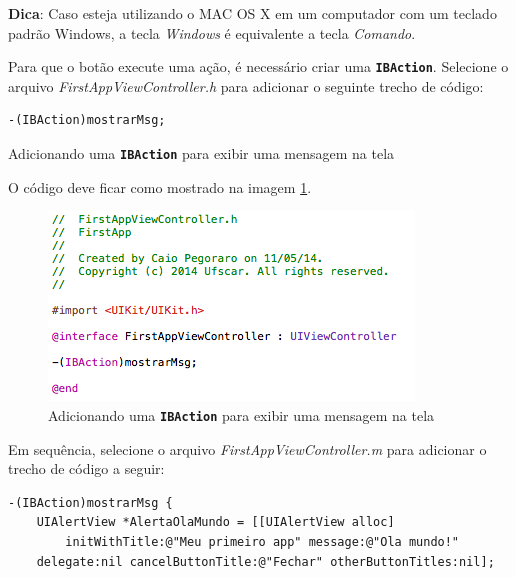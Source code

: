\documentclass[a4paper,12pt,brazil,doubleside]{book}
\begin{document}
\begin{singlespace}
\bigskip

\begin{framed}

\textbf{Dica}: Caso esteja utilizando o MAC OS X em um computador com um teclado padrão Windows, a tecla \textit{Windows }é equivalente a tecla \textit{Comando}.
\end{framed}



Para que o botão execute uma ação, é necessário criar uma \texttt{\textbf{IBAction}}. Selecione o arquivo \emph{FirstAppViewController.h} para adicionar o seguinte trecho de código:

\begin{listing}
\begin{verbatim}
-(IBAction)mostrarMsg;
\end{verbatim}
\caption{Adicionando uma \texttt{\textbf{IBAction}} para exibir uma mensagem na tela}
\end{listing}


O código deve ficar como mostrado na imagem \ref{fig:IBAction_msg}.

\begin{figure}[H]
  \centering
  \includegraphics[width=.75\textwidth]{figuras/3/tela_novo_projeto_21.png}
  \caption{Adicionando uma \texttt{\textbf{IBAction}} para exibir uma mensagem na tela}
  \label{fig:IBAction_msg}
\end{figure}


Em sequência, selecione o arquivo \emph{FirstAppViewController.m} para adicionar o  trecho de código a seguir:

\begin{listing}
\begin{verbatim}
-(IBAction)mostrarMsg {
    UIAlertView *AlertaOlaMundo = [[UIAlertView alloc] 
    	initWithTitle:@"Meu primeiro app" message:@"Ola mundo!" 
	delegate:nil cancelButtonTitle:@"Fechar" otherButtonTitles:nil];
    

\end{verbatim}
\end{listing}
\end{singlespace}
\end{document}
